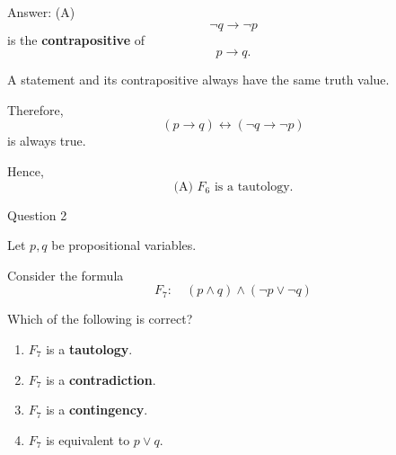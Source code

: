 \documentclass[aspectratio=169,11pt]{beamer}
\begin{document}
\begin{frame}

\begin{block}{Answer: (A)}
$$
\neg q\to\neg p
$$
is the \textbf{contrapositive} of
$$
p\to q.
$$

A statement and its contrapositive always have the same truth value.

Therefore,
$$
(p\to q)\leftrightarrow(\neg q\to\neg p)
$$
is always true.

Hence,
$$
\boxed{\text{(A) }F_6\text{ is a tautology.}}
$$
\end{block}

\end{frame}
\begin{frame}{Question 2}

Let $p,q$ be propositional variables.

Consider the formula
$$
F_7:\quad (p\land q)\land(\neg p\lor\neg q)
$$

Which of the following is correct?

\begin{enumerate}
    \item[(A)] $F_7$ is a \textbf{tautology}.
    \item[(B)] $F_7$ is a \textbf{contradiction}.
    \item[(C)] $F_7$ is a \textbf{contingency}.
    \item[(D)] $F_7$ is equivalent to $p\lor q$.
\end{enumerate}

\end{frame}
\end{document}
